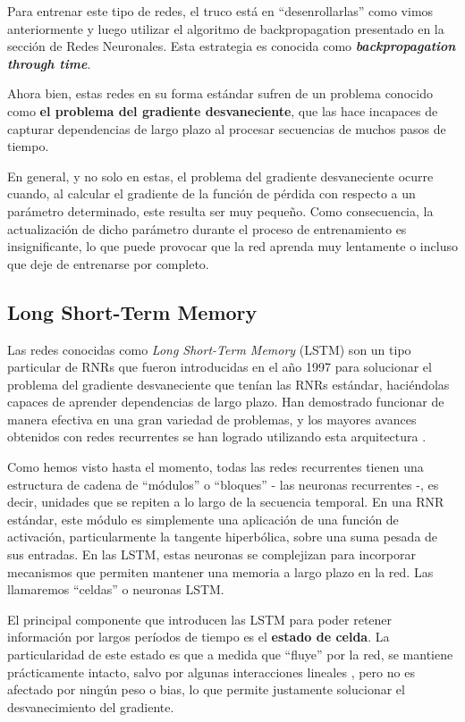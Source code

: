 \documentclass[../../main.tex]{subfiles}
\begin{document}
Para entrenar este tipo de redes, el truco está en ``desenrollarlas'' como vimos
anteriormente y luego utilizar el algoritmo de backpropagation presentado en la sección de
Redes Neuronales. Esta estrategia es conocida como \textbf{\textit{backpropagation through
time}}.

Ahora bien, estas redes en su forma estándar sufren de un problema conocido como
\textbf{el problema del gradiente desvaneciente}, que las hace incapaces de capturar
dependencias de largo plazo al procesar secuencias de muchos pasos de tiempo.

En general, y no solo en estas, el problema del gradiente desvaneciente ocurre cuando, al
calcular el gradiente de la función de pérdida con respecto a un parámetro determinado,
este resulta ser muy pequeño. Como consecuencia, la actualización de dicho parámetro
durante el proceso de entrenamiento es insignificante, lo que puede provocar que la red
aprenda muy lentamente o incluso que deje de entrenarse por completo.

\subsection{Long Short-Term Memory}
Las redes conocidas como \textit{Long Short-Term Memory} (LSTM) son un tipo particular de
RNRs que fueron introducidas en el año 1997 \cite{lstm-paper-1997} para solucionar el
problema del gradiente desvaneciente que tenían las RNRs estándar, haciéndolas capaces
de aprender dependencias de largo plazo. Han demostrado funcionar de manera efectiva en
una gran variedad de problemas, y los mayores avances obtenidos con redes recurrentes se
han logrado utilizando esta arquitectura \cite{colahs-blog-lstm-2015}.

Como hemos visto hasta el momento, todas las redes recurrentes tienen una estructura de
cadena de ``módulos'' o ``bloques'' \cite{colahs-blog-lstm-2015} - las neuronas
recurrentes -, es decir, unidades que se repiten a lo largo de la secuencia temporal. En
una RNR estándar, este módulo es simplemente una aplicación de una función de activación,
particularmente la tangente hiperbólica, sobre una suma pesada de sus entradas. En las
LSTM, estas neuronas se complejizan para incorporar mecanismos que permiten mantener
una memoria a largo plazo en la red. Las llamaremos ``celdas'' o neuronas LSTM.

El principal componente que introducen las LSTM para poder retener información por largos
períodos de tiempo es el \textbf{estado de celda}. La particularidad de este estado es que
a medida que ``fluye'' por la red, se mantiene prácticamente intacto, salvo por algunas
interacciones lineales \cite{colahs-blog-lstm-2015}, pero no es afectado por ningún peso o
bias, lo que permite justamente solucionar el desvanecimiento del gradiente.
\end{document}

